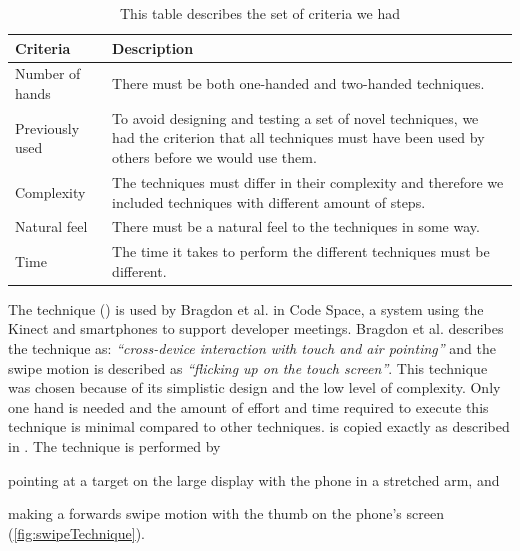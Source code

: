 \begin{table}[H]
	\centering
	\begin{tabular}{|p{}|p{}|}
		\hline
		\rowcolor[HTML]{9B9B9B} 
		\textbf{Criteria} & \textbf{Description} \\ \hline
		Number of hands & There must be both one-handed and two-handed techniques. \\ \hline
		Previously used & To avoid designing and testing a set of novel techniques, we had the criterion that all techniques must have been used by others before we would use them. \\ \hline
		Complexity & The techniques must differ in their complexity and therefore we included techniques with different amount of steps. \\ \hline
		Natural feel & There must be a natural feel to the techniques in some way. \\ \hline
		Time & The time it takes to perform the different techniques must be different. \\ \hline
	\end{tabular}
	\caption{This table describes the set of criteria we had }
	\label{tab:techniqueCriteria}
\end{table}

The \swipe technique () is used by Bragdon et al. \cite{Bragdon:2011} in Code Space, a system using the Kinect and smartphones to support developer meetings. 
Bragdon et al. describes the technique as: \emph{``cross-device interaction with touch and air pointing''} and the swipe motion is described as \emph{``flicking up on the touch screen''}. 
This technique was chosen because of its simplistic design and the low level of complexity.
Only one hand is needed and the amount of effort and time required to execute this technique is minimal compared to other techniques.
\swipe is copied exactly as described in \cite{Bragdon:2011}.
The \swipe technique is performed by 
\begin{enumerate*}[label=\itshape\roman*\upshape)]
	\item{pointing at a target on the large display with the phone in a stretched arm, and}
	\item{making a forwards swipe motion with the thumb on the phone's screen (\cref{fig:swipeTechnique}).}
\end{enumerate*}

